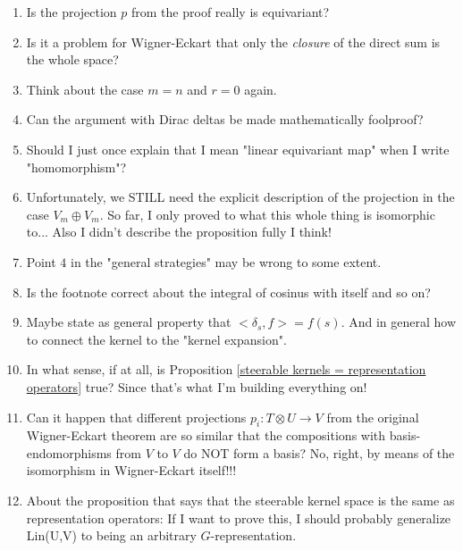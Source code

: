 \documentclass[12pt, a4paper]{article}
\theoremstyle{plain}
\theoremstyle{definition}
\theoremstyle{remark}
\begin{document}
\begin{enumerate}
\item Is the projection $p$ from the proof really is equivariant?
\item Is it a problem for Wigner-Eckart that only the \emph{closure} of the direct sum is the whole space?
\item Think about the case $m = n$ and $r = 0$ again.
\item Can the argument with Dirac deltas be made mathematically foolproof?
\item Should I just once explain that I mean "linear equivariant map" when I write "homomorphism"?
\item Unfortunately, we STILL need the explicit description of the projection in the case $V_m \oplus V_m$. So far, I only proved to what this whole thing is isomorphic to... Also I didn't describe the proposition fully I think!
\item Point $4$ in the "general strategies" may be wrong to some extent.
\item Is the footnote correct about the integral of cosinus with itself and so on?
\item Maybe state as general property that $<\delta_s, f> = f(s)$. And in general how to connect the kernel to the "kernel expansion".
\item In what sense, if at all, is Proposition \ref{steerable kernels = representation operators} true? Since that's what I'm building everything on!
\item Can it happen that different projections $p_i: T \otimes U \to V$ from the original Wigner-Eckart theorem are so similar that the compositions with basis-endomorphisms from $V$ to $V$ do NOT form a basis? No, right, by means of the isomorphism in Wigner-Eckart itself!!!
\item About the proposition that says that the steerable kernel space is the same as representation operators: If I want to prove this, I should probably generalize Lin(U,V) to being an arbitrary $G$-representation.
\end{enumerate}









 





\end{document}
